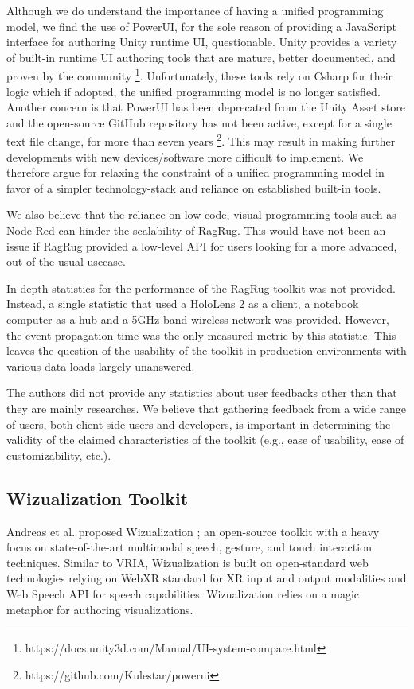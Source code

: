 \documentclass{vgtc}                          %
\begin{document}
\noindent Although we do understand the importance of having a unified programming model, we find the use of
PowerUI, for the sole reason of providing a JavaScript interface for authoring Unity runtime UI,
questionable. Unity provides a variety of built-in runtime UI authoring tools that are mature,
better documented, and proven by the community \footnote{https://docs.unity3d.com/Manual/UI-system-compare.html}.
Unfortunately, these tools rely on Csharp for their logic which if adopted, the unified programming model is
no longer satisfied. Another concern is that PowerUI has
been deprecated from the Unity Asset store and the open-source GitHub repository has not been active, except
for a single text file change, for more than seven years \footnote{https://github.com/Kulestar/powerui}.
This may result in making further developments with new devices/software more difficult to implement.
We therefore argue for relaxing the constraint of a unified programming model in favor of a simpler 
technology-stack and reliance on established built-in tools.

\smallskip

\noindent We also believe that the reliance on low-code, visual-programming tools such as Node-Red can hinder
the scalability of RagRug. This would have not been an issue if RagRug provided a low-level API for users
looking for a more advanced, out-of-the-usual usecase.

\medskip

\noindent In-depth statistics for the performance of the RagRug toolkit was not provided. Instead, a single
statistic that used a HoloLens 2 as a client, a notebook computer as a hub and a 5GHz-band wireless network
was provided. However, the event propagation time was the only measured metric by this statistic.
This leaves the question of the usability of the toolkit in production environments with various data loads
largely unanswered.

\medskip

\noindent The authors did not provide any statistics about user feedbacks other than that they are mainly
researches. We believe that gathering feedback from a wide range of users, both client-side users and
developers, is important in determining the validity of the claimed characteristics of the toolkit (e.g.,
ease of usability, ease of customizability, etc.).

\subsection{Wizualization Toolkit}
\noindent Andreas et al. proposed Wizualization \cite{wizualization_toolkit}; an open-source \cite{wizualization:repo}
toolkit with a heavy focus on state-of-the-art multimodal speech, gesture, and touch interaction techniques.
Similar to VRIA, Wizualization is built on open-standard web technologies relying on WebXR standard for XR
input and output modalities and Web Speech API for speech capabilities. Wizualization relies on a magic
metaphor for authoring visualizations.
\end{document}
